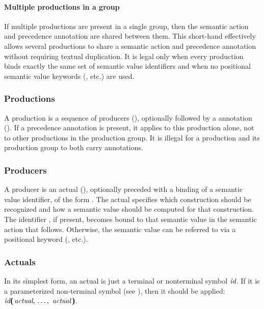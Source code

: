 \documentclass[onecolumn,11pt,nocopyrightspace,preprint]{sigplanconf}
\begin{document}
\paragraph{Multiple productions in a group}

If multiple productions are present in a single group, then the semantic
action and precedence annotation are shared between them. This short-hand
effectively allows several productions to share a semantic action and
precedence annotation without requiring textual duplication. It is legal only
when every production binds exactly the same set of semantic value identifiers
and when no positional semantic value keywords (, etc.) are used.

\subsubsection{Productions}
\label{sec:productions}

A production is a sequence of producers (), optionally
followed by a \dprec annotation (). If a precedence annotation
is present, it applies to this production alone, not to other productions in
the production group. It is illegal for a production and its production group
to both carry \dprec annotations.

\subsubsection{Producers}
\label{sec:producers}

A producer is an actual (), optionally preceded with a
binding of a semantic value identifier, of the form  \dequal. The
actual specifies which construction should be recognized and how a semantic
value should be computed for that construction. The identifier , if
present, becomes bound to that semantic value in the semantic action that
follows. Otherwise, the semantic value can be referred to via a positional
keyword (, etc.).

\subsubsection{Actuals}
\label{sec:actual}

In its simplest form, an actual is just a terminal or nonterminal symbol
$\textit{id}$. If it is a parameterized non-terminal symbol (see
), then it should be applied:
$\nt{id}\dlpar\sepcommalist{\nt{actual}}\drpar$.
\end{document}
